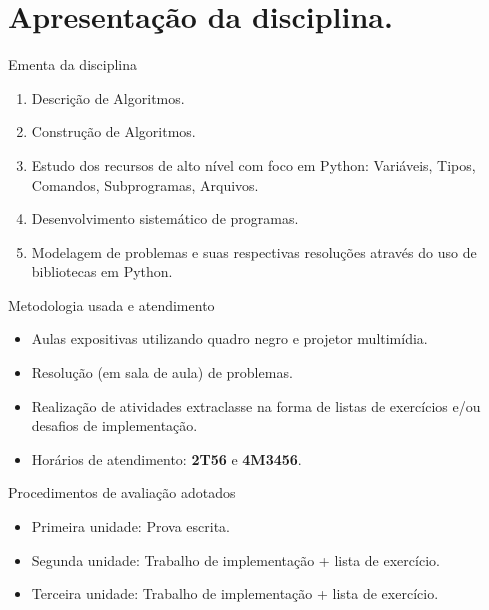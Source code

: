\section{Apresentação da disciplina.}

\begin{frame}{Ementa da disciplina}
  \begin{enumerate}
    \item Descrição de Algoritmos.
    \item Construção de Algoritmos.
    \item Estudo dos recursos de alto nível com foco em Python: Variáveis, Tipos, Comandos, Subprogramas, Arquivos.
    \item Desenvolvimento sistemático de programas.
    \item Modelagem de problemas e suas respectivas resoluções através do uso de bibliotecas em Python.
  \end{enumerate}
\end{frame}

\begin{frame}{Metodologia usada e atendimento}
  \begin{itemize}
    \item Aulas expositivas utilizando quadro negro e projetor multimídia.
    \item Resolução (em sala de aula) de problemas. 
    \item Realização de atividades extraclasse na forma de listas de exercícios e/ou desafios de implementação.
  \end{itemize}
  \pause
  \begin{itemize}
    \item Horários de atendimento: \textbf{2T56} e \textbf{4M3456}.
  \end{itemize}
\end{frame}

\begin{frame}{Procedimentos de avaliação adotados}
  \begin{itemize}
    \item Primeira unidade: Prova escrita.
    \item Segunda unidade: Trabalho de implementação + lista de exercício.
    \item Terceira unidade: Trabalho de implementação + lista de exercício.
  \end{itemize}
\end{frame}